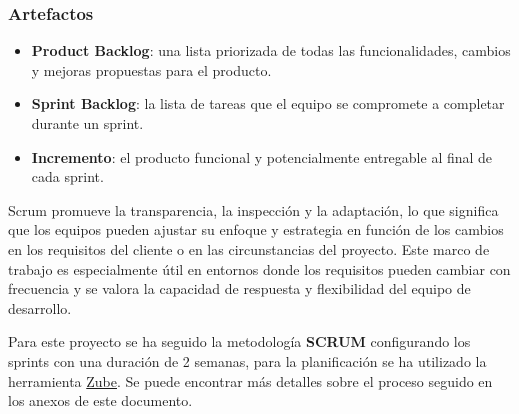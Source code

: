 \subsubsection{Artefactos}

\begin{itemize}
\item \textbf{Product Backlog}: una lista priorizada de todas las funcionalidades, cambios y mejoras propuestas para el producto.
\item \textbf{Sprint Backlog}: la lista de tareas que el equipo se compromete a completar durante un sprint.
\item \textbf{Incremento}: el producto funcional y potencialmente entregable al final de cada sprint.
\end{itemize}

Scrum promueve la transparencia, la inspección y la adaptación, lo que significa que los equipos pueden ajustar su enfoque y estrategia en función de los cambios en los requisitos del cliente o en las circunstancias del proyecto. Este marco de trabajo es especialmente útil en entornos donde los requisitos pueden cambiar con frecuencia y se valora la capacidad de respuesta y flexibilidad del equipo de desarrollo.

Para este proyecto se ha seguido la metodología \textbf{SCRUM} configurando los sprints con una duración de 2 semanas,
para la planificación se ha utilizado la herramienta \href{https://zube.io/tgs1003/tfg_2023_2024}{Zube}.
Se puede encontrar más detalles sobre el proceso seguido en los anexos de este documento.

